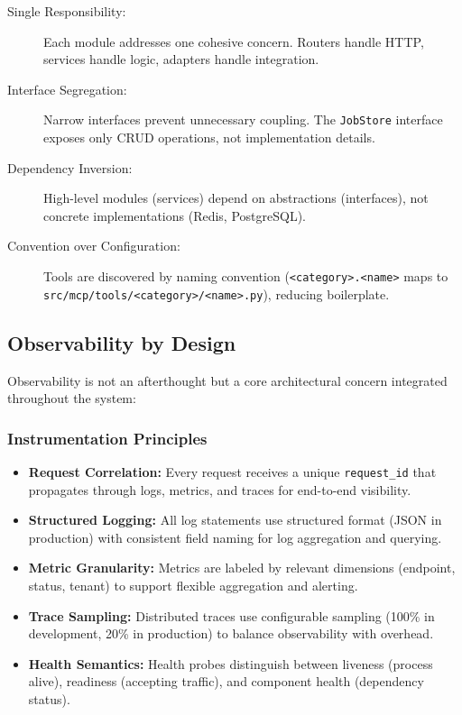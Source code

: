 \begin{description}
    \item[Single Responsibility:] Each module addresses one cohesive concern. Routers handle HTTP, services handle logic, adapters handle integration.
    
    \item[Interface Segregation:] Narrow interfaces prevent unnecessary coupling. The \texttt{JobStore} interface exposes only CRUD operations, not implementation details.
    
    \item[Dependency Inversion:] High-level modules (services) depend on abstractions (interfaces), not concrete implementations (Redis, PostgreSQL).
    
    \item[Convention over Configuration:] Tools are discovered by naming convention (\texttt{<category>.<name>} maps to \texttt{src/mcp/tools/<category>/<name>.py}), reducing boilerplate.
\end{description}

\subsection{Observability by Design}
\label{subsec:observability-by-design}

Observability is not an afterthought but a core architectural concern integrated throughout the system:

\subsubsection{Instrumentation Principles}

\begin{itemize}
    \item \textbf{Request Correlation:} Every request receives a unique \texttt{request\_id} that propagates through logs, metrics, and traces for end-to-end visibility.
    
    \item \textbf{Structured Logging:} All log statements use structured format (JSON in production) with consistent field naming for log aggregation and querying.
    
    \item \textbf{Metric Granularity:} Metrics are labeled by relevant dimensions (endpoint, status, tenant) to support flexible aggregation and alerting.
    
    \item \textbf{Trace Sampling:} Distributed traces use configurable sampling (100\% in development, 20\% in production) to balance observability with overhead.
    
    \item \textbf{Health Semantics:} Health probes distinguish between liveness (process alive), readiness (accepting traffic), and component health (dependency status).
\end{itemize}

